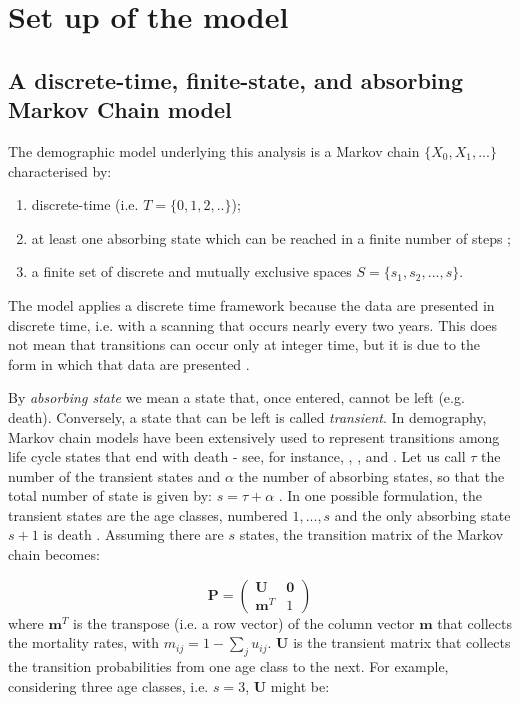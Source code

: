 \documentclass[\main/main.tex]{subfiles}
\begin{document}
\section{Set up of the model}
\subsection{A discrete-time, finite-state, and absorbing\\ Markov Chain model}

The demographic model underlying this analysis is a Markov chain $\{X_0, X_1, ...\}$ characterised by:
\begin{enumerate}
\item discrete-time (i.e. $T = \{ 0,1,2,..\}$);
\item at least one absorbing state which can be reached in a finite number of steps \citep{Grinstead1997};
\item a finite set of discrete and mutually exclusive spaces $S = \{s_1, s_2, ..., s\}$.
\end{enumerate}
The model applies a discrete time framework because the data are presented in discrete time, i.e. with a scanning that occurs nearly every two years. This does not mean that transitions can occur only at integer time, but it is due to the form in which that data are presented \citep{haberman1999}.


By \textit{absorbing state} we mean a state that, once entered, cannot be left (e.g. death). Conversely, a state that can be left is called \textit{transient}.
In demography, Markov chain models have been extensively used to represent transitions among life cycle states that end with death - see, for instance, \cite{Caswell2001, Caswell2006, Caswell2009}, \cite{Fujiwara2002}, and \cite{Cochran1992}.
Let us call $\tau$ the number of the transient states and $\alpha$ the number of absorbing states, so that the total number of state is given by: $s = \tau + \alpha$ \citep{VanDaalen2017}.
In one possible formulation, the transient states are the age classes, numbered $1,..., s$ and the only absorbing state $s+1$ is death \citep{Caswell2018}. 
Assuming there are $s$ states, the transition matrix of the Markov chain becomes:


\begin{equation}
    \mathbf{P} = \begin{pmatrix}
        \mathbf{U} &  \mathbf{0}\\
    \mathbf{m}^T& 1
    \end{pmatrix}
\end{equation}
where $ \mathbf{m}^T$ is the transpose (i.e. a row vector) of the column vector $\mathbf{m}$ that collects the mortality rates, with $m_{ij} = 1 - \sum_{j} u_{ij}$. $\mathbf{U}$ is the transient matrix that collects the transition probabilities from one age class to the next. For example, considering three age classes, i.e. $s = 3$, $\mathbf{U}$ might be:
\end{document}
